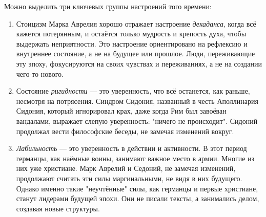 Можно выделить три ключевых группы настроений того времени:
\begin{enumerate}
    \item Стоицизм Марка Аврелия хорошо отражает настроение \textit{декаданса}, когда всё кажется потерянным, и остаётся только мудрость и крепость духа, чтобы выдержать неприятности. Это настроение ориентировано на рефлексию и внутреннее состояние, а не на будущее или прошлое. Люди, переживающие эту эпоху, фокусируются на своих чувствах и переживаниях, а не на создании чего-то нового.
    \item Состояние \textit{ригидности} — это уверенность, что всё останется, как раньше, несмотря на потрясения. Синдром Сидония, названный в честь Аполлинария Сидония, который игнорировал крах, даже когда Рим был завоёван вандалами, выражает слепую уверенность: "ничего не происходит". Сидоний продолжал вести философские беседы, не замечая изменений вокруг.
    \item \textit{Лабильность} — это уверенность в действии и активности. В этот период германцы, как наёмные воины, занимают важное место в армии. Многие из них уже христиане. Марк Аврелий и Седоний, не замечая изменений, продолжают считать эти силы маргинальными, не видя в них будущего. Однако именно такие "неучтённые" силы, как германцы и первые христиане, станут лидерами будущей эпохи. Они не писали тексты, а занимались делом, создавая новые структуры.
\end{enumerate}

 

